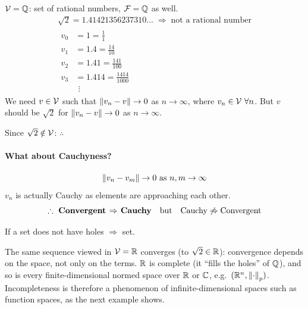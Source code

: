 \begin{example}
$\mathcal{V} = \mathbb{Q}$: set of rational numbers, $\mathcal{F} = \mathbb{Q}$ as well.
\begin{gather*}
\sqrt{2} = 1.41421356237310\ldots \;\Rightarrow\; \text{not a rational number}\\[6pt]
\begin{aligned}
v_0 &= 1 = \tfrac11\\
v_1 &= 1.4 = \tfrac{14}{10}\\
v_2 &= 1.41 = \tfrac{141}{100}\\
v_3 &= 1.414 = \tfrac{1414}{1000}\\
&\ \,\vdots
\end{aligned}
\end{gather*}
We need $v\in\mathcal{V}$ such that $\left\lVert v_n - v \right\rVert\to 0$ as $n\to\infty$, where $v_n \in\mathcal{V}\ \forall n$.
But $v$ should be $\sqrt2$ for $\left\lVert v_n - v \right\rVert\to 0$ as $n\to\infty$.
\begin{center}
\end{center}
Since $\sqrt2\notin\mathcal{V}$: $\therefore$ 

\paragraph{What about Cauchyness?}
\[
\left\lVert v_n - v_m \right\rVert \to 0 \text{ as } n,m\to\infty
\]
$v_n$ is actually Cauchy as elements are approaching each other.
\[
\therefore\ \text{\textbf{Convergent $\Rightarrow$ Cauchy}} \quad\text{but}\quad \text{Cauchy} \not\Rightarrow \text{Convergent}
\]
\end{example}
If a set does not have holes $\Rightarrow$  set.
\begin{insight}
The same sequence viewed in $\mathcal{V}=\mathbb{R}$ converges (to $\sqrt2\in\mathbb{R}$): convergence depends on the space, not only on the terms. $\mathbb{R}$ is complete (it ``fills the holes'' of $\mathbb{Q}$), and so is every finite-dimensional normed space over $\mathbb{R}$ or $\mathbb{C}$, e.g.\ $(\mathbb{R}^n,\left\lVert \cdot \right\rVert_p)$. Incompleteness is therefore a phenomenon of infinite-dimensional spaces such as function spaces, as the next example shows.
\end{insight}

